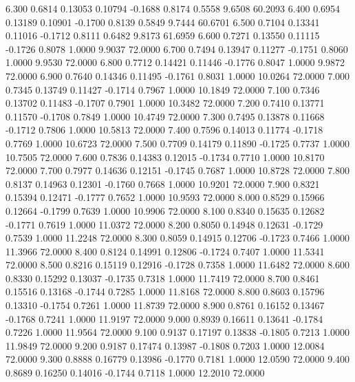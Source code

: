   6.300   0.6814   0.13053   0.10794  -0.1688   0.8174   0.5558   9.6508  60.2093
   6.400   0.6954   0.13189   0.10901  -0.1700   0.8139   0.5849   9.7444  60.6701
   6.500   0.7104   0.13341   0.11016  -0.1712   0.8111   0.6482   9.8173  61.6959
   6.600   0.7271   0.13550   0.11115  -0.1726   0.8078   1.0000   9.9037  72.0000
   6.700   0.7494   0.13947   0.11277  -0.1751   0.8060   1.0000   9.9530  72.0000
   6.800   0.7712   0.14421   0.11446  -0.1776   0.8047   1.0000   9.9872  72.0000
   6.900   0.7640   0.14346   0.11495  -0.1761   0.8031   1.0000  10.0264  72.0000
   7.000   0.7345   0.13749   0.11427  -0.1714   0.7967   1.0000  10.1849  72.0000
   7.100   0.7346   0.13702   0.11483  -0.1707   0.7901   1.0000  10.3482  72.0000
   7.200   0.7410   0.13771   0.11570  -0.1708   0.7849   1.0000  10.4749  72.0000
   7.300   0.7495   0.13878   0.11668  -0.1712   0.7806   1.0000  10.5813  72.0000
   7.400   0.7596   0.14013   0.11774  -0.1718   0.7769   1.0000  10.6723  72.0000
   7.500   0.7709   0.14179   0.11890  -0.1725   0.7737   1.0000  10.7505  72.0000
   7.600   0.7836   0.14383   0.12015  -0.1734   0.7710   1.0000  10.8170  72.0000
   7.700   0.7977   0.14636   0.12151  -0.1745   0.7687   1.0000  10.8728  72.0000
   7.800   0.8137   0.14963   0.12301  -0.1760   0.7668   1.0000  10.9201  72.0000
   7.900   0.8321   0.15394   0.12471  -0.1777   0.7652   1.0000  10.9593  72.0000
   8.000   0.8529   0.15966   0.12664  -0.1799   0.7639   1.0000  10.9906  72.0000
   8.100   0.8340   0.15635   0.12682  -0.1771   0.7619   1.0000  11.0372  72.0000
   8.200   0.8050   0.14948   0.12631  -0.1729   0.7539   1.0000  11.2248  72.0000
   8.300   0.8059   0.14915   0.12706  -0.1723   0.7466   1.0000  11.3966  72.0000
   8.400   0.8124   0.14991   0.12806  -0.1724   0.7407   1.0000  11.5341  72.0000
   8.500   0.8216   0.15119   0.12916  -0.1728   0.7358   1.0000  11.6482  72.0000
   8.600   0.8330   0.15292   0.13037  -0.1735   0.7318   1.0000  11.7419  72.0000
   8.700   0.8461   0.15516   0.13168  -0.1744   0.7285   1.0000  11.8168  72.0000
   8.800   0.8603   0.15796   0.13310  -0.1754   0.7261   1.0000  11.8739  72.0000
   8.900   0.8761   0.16152   0.13467  -0.1768   0.7241   1.0000  11.9197  72.0000
   9.000   0.8939   0.16611   0.13641  -0.1784   0.7226   1.0000  11.9564  72.0000
   9.100   0.9137   0.17197   0.13838  -0.1805   0.7213   1.0000  11.9849  72.0000
   9.200   0.9187   0.17474   0.13987  -0.1808   0.7203   1.0000  12.0084  72.0000
   9.300   0.8888   0.16779   0.13986  -0.1770   0.7181   1.0000  12.0590  72.0000
   9.400   0.8689   0.16250   0.14016  -0.1744   0.7118   1.0000  12.2010  72.0000
